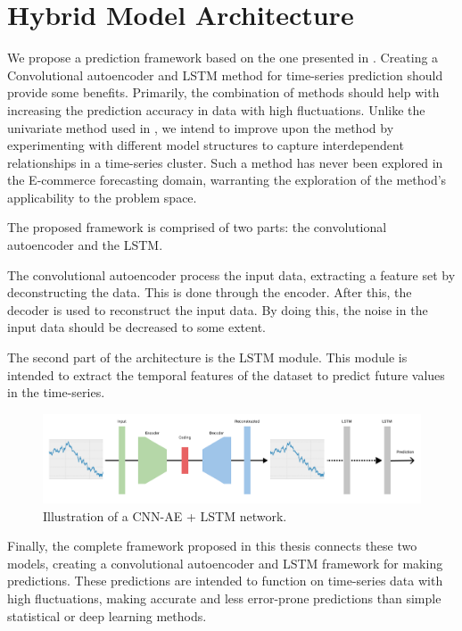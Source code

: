 \section{Hybrid Model Architecture}
\label{section:Architecture:Model}

We propose a prediction framework based on the one presented in \cite{Zhao2019}.
Creating a Convolutional autoencoder and LSTM method for time-series prediction should provide some benefits.
Primarily, the combination of methods should help with increasing the prediction accuracy in data with high fluctuations.
Unlike the univariate method used in \cite{Zhao2019},
we intend to improve upon the method by experimenting with different model structures to capture interdependent relationships in a time-series cluster.
Such a method has never been explored in the E-commerce forecasting domain, warranting the exploration of the method's applicability to the problem space.

The proposed framework is comprised of two parts: the convolutional autoencoder and the LSTM.

The convolutional autoencoder process the input data, extracting a feature set by deconstructing the data.
This is done through the encoder. After this, the decoder is used to reconstruct the input data.
By doing this, the noise in the input data should be decreased to some extent.

The second part of the architecture is the LSTM module.
This module is intended to extract the temporal features of the dataset
to predict future values in the time-series.

\begin{figure}[h!]
  \centering
  \includegraphics[width=\textwidth]{./figs/illustrations/CNN-AE + LSTM.png}
  \hfill
  \caption{Illustration of a CNN-AE + LSTM network.}
  \label{fig:cnn-ae+lstm-network}
\end{figure}

Finally, the complete framework proposed in this thesis connects these two models,
creating a convolutional autoencoder and LSTM framework for making predictions.
These predictions are intended to function on time-series data with high fluctuations,
making accurate and less error-prone predictions than simple statistical or deep learning methods.


